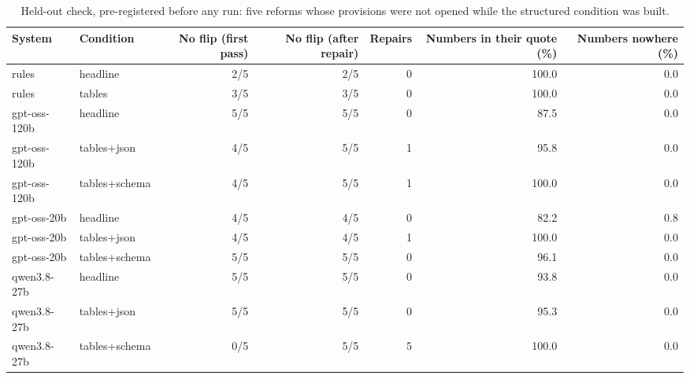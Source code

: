 \begin{table}[t]
\centering\small
\caption{Held-out check, pre-registered before any run: five reforms whose provisions were not opened while the structured condition was built.}
\label{tab:heldout}
\begin{tabular}{llrrrrr}
\toprule
System & Condition & No flip (first pass) & No flip (after repair) & Repairs & Numbers in their quote (\%) & Numbers nowhere (\%) \\
\midrule
rules & headline & 2/5 & 2/5 & 0 & 100.0 & 0.0 \\
rules & tables & 3/5 & 3/5 & 0 & 100.0 & 0.0 \\
gpt-oss-120b & headline & 5/5 & 5/5 & 0 & 87.5 & 0.0 \\
gpt-oss-120b & tables+json & 4/5 & 5/5 & 1 & 95.8 & 0.0 \\
gpt-oss-120b & tables+schema & 4/5 & 5/5 & 1 & 100.0 & 0.0 \\
gpt-oss-20b & headline & 4/5 & 4/5 & 0 & 82.2 & 0.8 \\
gpt-oss-20b & tables+json & 4/5 & 4/5 & 1 & 100.0 & 0.0 \\
gpt-oss-20b & tables+schema & 5/5 & 5/5 & 0 & 96.1 & 0.0 \\
qwen3.8-27b & headline & 5/5 & 5/5 & 0 & 93.8 & 0.0 \\
qwen3.8-27b & tables+json & 5/5 & 5/5 & 0 & 95.3 & 0.0 \\
qwen3.8-27b & tables+schema & 0/5 & 5/5 & 5 & 100.0 & 0.0 \\
\bottomrule
\end{tabular}
\end{table}
